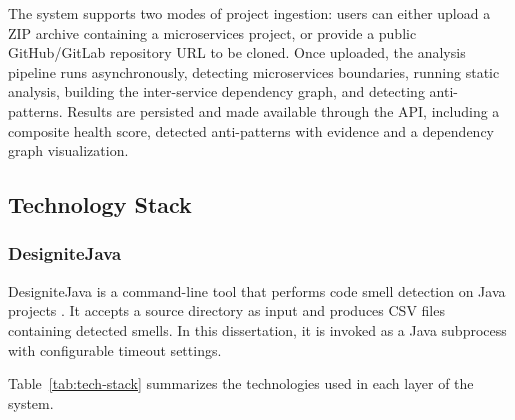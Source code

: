 The system supports two modes of project ingestion: users can either upload a ZIP archive containing a microservices project, or provide a public GitHub/GitLab repository URL to be cloned. Once uploaded, the analysis pipeline runs asynchronously, detecting microservices boundaries, running static analysis, building the inter-service dependency graph, and detecting anti-patterns. Results are persisted and made available through the API, including a composite health score, detected anti-patterns with evidence and a dependency graph visualization.

\subsection{Technology Stack}
\label{subsec:tech-stack}

\subsubsection{DesigniteJava}
\label{subsec:designite-java}

 \par DesigniteJava is a command-line tool that performs code smell detection on Java projects \cite{Sharma2024}. It accepts a source directory as input and produces CSV files containing detected smells. In this dissertation, it is invoked as a Java subprocess with configurable timeout settings.

Table~\ref{tab:tech-stack} summarizes the technologies used in each layer of the system.

